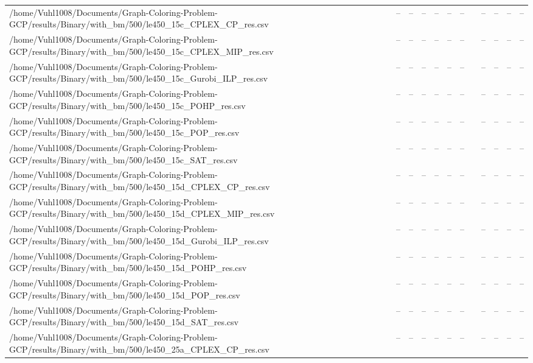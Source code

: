 \begin{table}[htbp]
\begin{tabular}{llllllllllll}
/home/Vuhl1008/Documents/Graph-Coloring-Problem-GCP/results/Binary/with\_bm/500/le450\_15c\_CPLEX\_CP\_res.csv & -- & -- & -- & -- & -- & -- & {} & -- & -- & -- & -- \\
/home/Vuhl1008/Documents/Graph-Coloring-Problem-GCP/results/Binary/with\_bm/500/le450\_15c\_CPLEX\_MIP\_res.csv & -- & -- & -- & -- & -- & -- & {} & -- & -- & -- & -- \\
/home/Vuhl1008/Documents/Graph-Coloring-Problem-GCP/results/Binary/with\_bm/500/le450\_15c\_Gurobi\_ILP\_res.csv & -- & -- & -- & -- & -- & -- & {} & -- & -- & -- & -- \\
/home/Vuhl1008/Documents/Graph-Coloring-Problem-GCP/results/Binary/with\_bm/500/le450\_15c\_POHP\_res.csv & -- & -- & -- & -- & -- & -- & {} & -- & -- & -- & -- \\
/home/Vuhl1008/Documents/Graph-Coloring-Problem-GCP/results/Binary/with\_bm/500/le450\_15c\_POP\_res.csv & -- & -- & -- & -- & -- & -- & {} & -- & -- & -- & -- \\
/home/Vuhl1008/Documents/Graph-Coloring-Problem-GCP/results/Binary/with\_bm/500/le450\_15c\_SAT\_res.csv & -- & -- & -- & -- & -- & -- & {} & -- & -- & -- & -- \\
/home/Vuhl1008/Documents/Graph-Coloring-Problem-GCP/results/Binary/with\_bm/500/le450\_15d\_CPLEX\_CP\_res.csv & -- & -- & -- & -- & -- & -- & {} & -- & -- & -- & -- \\
/home/Vuhl1008/Documents/Graph-Coloring-Problem-GCP/results/Binary/with\_bm/500/le450\_15d\_CPLEX\_MIP\_res.csv & -- & -- & -- & -- & -- & -- & {} & -- & -- & -- & -- \\
/home/Vuhl1008/Documents/Graph-Coloring-Problem-GCP/results/Binary/with\_bm/500/le450\_15d\_Gurobi\_ILP\_res.csv & -- & -- & -- & -- & -- & -- & {} & -- & -- & -- & -- \\
/home/Vuhl1008/Documents/Graph-Coloring-Problem-GCP/results/Binary/with\_bm/500/le450\_15d\_POHP\_res.csv & -- & -- & -- & -- & -- & -- & {} & -- & -- & -- & -- \\
/home/Vuhl1008/Documents/Graph-Coloring-Problem-GCP/results/Binary/with\_bm/500/le450\_15d\_POP\_res.csv & -- & -- & -- & -- & -- & -- & {} & -- & -- & -- & -- \\
/home/Vuhl1008/Documents/Graph-Coloring-Problem-GCP/results/Binary/with\_bm/500/le450\_15d\_SAT\_res.csv & -- & -- & -- & -- & -- & -- & {} & -- & -- & -- & -- \\
/home/Vuhl1008/Documents/Graph-Coloring-Problem-GCP/results/Binary/with\_bm/500/le450\_25a\_CPLEX\_CP\_res.csv & -- & -- & -- & -- & -- & -- & {} & -- & -- & -- & -- \\

\end{tabular}
\end{table}

